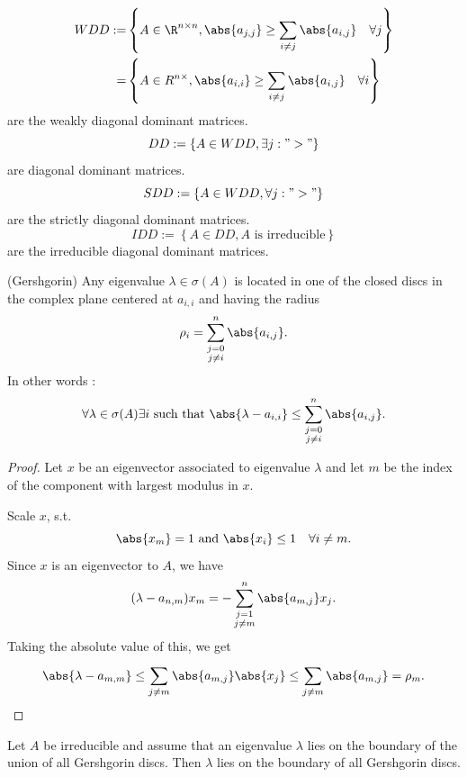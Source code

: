 \begin{definition}
\label{thm:WDDmatrices}
\begin{align*}
	WDD:= &\left\{ A \in \R^{n \times n}, \abs{a_{j,j}}  \geq \sum_{i\neq j}^{}{\abs{a_{i,j}} } \quad \forall j \right\}  \\
		 = &\left\{ A \in R^{n \times }, \abs{a_{i,i}} \geq \sum_{i\neq j}^{}{\abs{a_{i,j}} } \quad \forall i \right\} 
\end{align*}
are the weakly diagonal dominant matrices.
\[
DD:= \left\{ A \in WDD, \exists j : ">" \right\} 
\] 
are diagonal dominant matrices.
\[
SDD := \left\{ A \in WDD, \forall j : ">" \right\} 
\] 
are the strictly diagonal dominant matrices.
\[
IDD := \left\{ A \in DD, A \text{ is irreducible} \right\} 
\] 
are the irreducible diagonal dominant matrices.
\end{definition}

\begin{theorem}(Gershgorin)
\label{thm:gershgorin}
Any eigenvalue $\lambda \in \sigma (A)$ is located in one of the closed discs in the complex plane centered at $a_{i,i}$ and having the radius
\[
	\rho_{i} = \sum_{\substack{j=0 \\ j \neq i}}^{n}{\abs{a_{i,j}} }
.\] 
In other words : 
\[
	\forall \lambda \in \sigma (A) \exists i \text{ such that } \abs{\lambda - a_{i,i}}  \leq \sum_{\substack{j=0 \\ j \neq i}}^{n}{\abs{a_{i,j}} }
.\] 
\end{theorem}

\begin{proof}
\label{thm:gershgorinproof}
	Let $x$ be an eigenvector associated to eigenvalue $\lambda$ and let $m$ be the index of the component with largest modulus in $x$.

	Scale $x$, s.t.
	\[
	\abs{x_{m}}  = 1 \text{ and } \abs{x_{i}} \leq 1 \quad \forall i \neq m
	.\] 
	Since $x$ is an eigenvector to $A$, we have
	\[
		(\lambda - a_{n,m}) x_{m} = - \sum_{\substack{j=1 \\ j \neq m}}^{n}{\abs{a_{m,j}} x_{j}}
	.\] 
	Taking the absolute value of this, we get
	\[
		\abs{\lambda - a_{m,m}}  \leq \sum_{j\neq m}^{}{\abs{a_{m,j}} \abs{x_{j}} } \leq \sum_{j\neq m}^{}{\abs{a_{m,j}} } = \rho_{m}
	.\] 
\end{proof}

\begin{theorem}
\label{thm:gershgorinboundary}
	Let $A$ be irreducible and assume that an eigenvalue $\lambda$ lies on the boundary of the union of all Gershgorin discs. Then $\lambda$ lies on the boundary of all Gershgorin discs.
\end{theorem}

